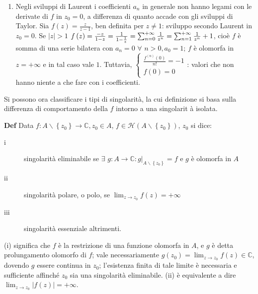 \documentclass{article}
\begin{document}
\begin{enumerate}
\item Negli sviluppi di Laurent i coefficienti $a_{n}$ in generale non hanno
legami con le derivate di $f$ in $z_{0}=0$, a differenza di quanto accade
con gli sviluppi di Taylor. Sia $f\left( z\right) =\frac{z}{z-1}$, ben
definita per $z\neq 1$: sviluppo secondo Laurent in $z_{0}=0$. Se $%
\left\vert z\right\vert >1$ $f\left( z\right) =\frac{-z}{1-z}=\frac{1}{1-%
\frac{1}{z}}=\sum_{n=0}^{+\infty }\frac{1}{z^{n}}=\sum_{n=1}^{+\infty }\frac{%
1}{z^{n}}+1$, cio\`{e} $f$ \`{e} somma di una serie bilatera con $a_{n}=0$ $%
\forall $ $n>0,a_{0}=1$; $f$ \`{e} olomorfa in $z=+\infty $ e in tal caso
vale $1$. Tuttavia, $\left\{ 
\begin{array}{c}
\frac{f^{\left( n\right) }\left( 0\right) }{n!}=-1 \\ 
f\left( 0\right) =0%
\end{array}%
\right. $: valori che non hanno niente a che fare con i coefficienti.
\end{enumerate}

Si possono ora classificare i tipi di singolarit\`{a}, la cui definizione si
basa sulla differenza di comportamento della $f$ intorno a una singolarit%
\`{a} isolata.

\textbf{Def} Data $f:A\backslash \left\{ z_{0}\right\} \rightarrow 
\mathbb{C}
,z_{0}\in A$, $f\in \mathcal{H}\left( A\backslash \left\{ z_{0}\right\}
\right) $, $z_{0}$ si dice:

\begin{description}
\item[i] singolarit\`{a} eliminabile se $\exists $ $g:A\rightarrow 
\mathbb{C}
:g|_{A\backslash \left\{ z_{0}\right\} }=f$ e $g$ \`{e} olomorfa in $A$

\item[ii] singolarit\`{a} polare, o polo, se $\lim_{z\rightarrow
z_{0}}f\left( z\right) =+\infty $

\item[iii] singolarit\`{a} essenziale altrimenti.
\end{description}

(i) significa che $f$ \`{e} la restrizione di una funzione olomorfa in $A$,
e $g$ \`{e} detta prolungamento olomorfo di $f$; vale necessariamente $%
g\left( z_{0}\right) =\lim_{z\rightarrow z_{0}}f\left( z\right) \in 
\mathbb{C}
$, dovendo $g$ essere continua in $z_{0}$; l'esistenza finita di tale limite 
\`{e} necessaria e sufficiente affinch\'{e} $z_{0}$ sia una singolarit\`{a}
eliminabile. (ii) \`{e}
equivalente a dire $\lim_{z\rightarrow z_{0}}\left\vert f\left( z\right)
\right\vert =+\infty $.
\end{document}
